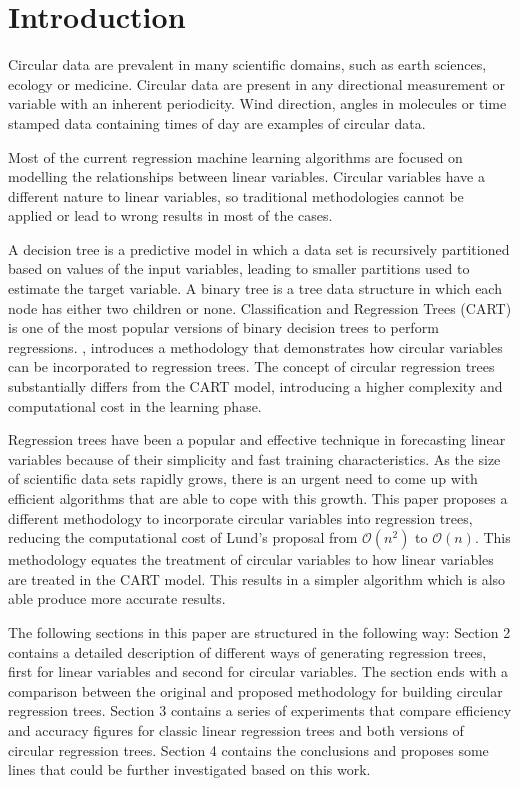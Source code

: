 \documentclass[times,twocolumn,final,authoryear]{elsarticle}
\begin{document}

\section{Introduction}
\label{intro}
Circular data are prevalent in many scientific domains, such as earth sciences, ecology or medicine. Circular data are present in any directional measurement or variable with an inherent periodicity. Wind direction, angles in molecules or time stamped data containing times of day are examples of circular data.

Most of the current regression machine learning algorithms are focused on modelling the relationships between linear variables. Circular variables have a different nature to linear variables, so traditional methodologies cannot be applied or lead to wrong results in most of the cases.

A decision tree is a predictive model in which a data set is recursively partitioned based on values of the input variables, leading to smaller partitions used to estimate the target variable. A binary tree is a tree data structure in which each node has either two children or none. Classification and Regression Trees (CART) \citep{Breimanetal1984} is one of the most popular versions of binary decision trees to perform regressions. \citep{Lund2002}, introduces a methodology that demonstrates how circular variables can be incorporated to regression trees. The concept of circular regression trees substantially differs from the CART model, introducing a higher complexity and computational cost in the learning phase. 

Regression trees have been a popular and effective technique in forecasting linear variables because of their simplicity and fast training characteristics. As the size of scientific data sets rapidly grows, there is an urgent need to come up with efficient algorithms that are able to cope with this growth. This paper proposes a different methodology to incorporate circular variables into regression trees, reducing the computational cost of Lund's proposal from $\mathcal{O}(n^2)$ to $\mathcal{O}(n)$. This methodology equates the treatment of circular variables to how linear variables are treated in the CART model. This results in a simpler algorithm which is also able produce more accurate results.

The following sections in this paper are structured in the following way: Section 2 contains a detailed description of different ways of generating regression trees, first for linear variables and second for circular variables. The section ends with a comparison between the original and proposed methodology for building circular regression trees. Section 3 contains a series of experiments that compare efficiency and accuracy figures for classic linear regression trees and both versions of circular regression trees. Section 4 contains the conclusions and proposes some lines that could be further investigated based on this work.
\end{document}

